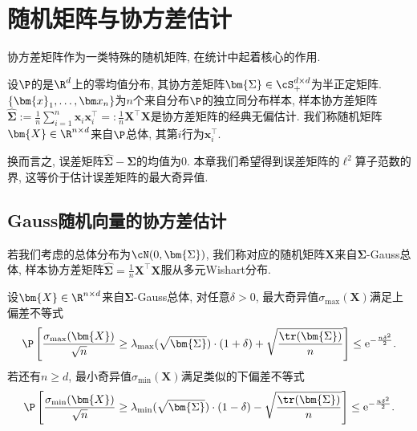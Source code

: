\section{随机矩阵与协方差估计}

协方差矩阵作为一类特殊的随机矩阵, 在统计中起着核心的作用. 

设$\P$的是$\R^d$上的零均值分布, 其协方差矩阵$\bm{\Sigma} \in \cS^{d \times d}_+$为半正定矩阵.
$\{\bm{x}_1, \dots, \bx_n\}$为$n$个来自分布$\P$的独立同分布样本, 样本协方差矩阵$\hat{\bm{\Sigma}} := \frac{1}{n} \sum_{i = 1}^n \bm{x}_i \bm{x}_i^\top =: \frac{1}{n} \bm{X}^\top \bm{X}$是协方差矩阵的经典无偏估计. 
我们称随机矩阵$\bm{X} \in \R^{n \times d}$来自$\P$总体, 其第$i$行为$\bm{x}_i^\top$.  

换而言之, 误差矩阵$\hat{\bm{\Sigma}} - \bm{\Sigma}$的均值为$0$. 
本章我们希望得到误差矩阵的$\ell^2$算子范数的界, 这等价于估计误差矩阵的最大奇异值. 

\subsection{Gauss随机向量的协方差估计}

若我们考虑的总体分布为$\cN(0, \bm{\Sigma})$, 我们称对应的随机矩阵$\bm{X}$来自$\bm{\Sigma}$-Gauss总体, 样本协方差矩阵$\hat{\bm{\Sigma}} = \frac{1}{n} \bm{X}^\top \bm{X}$服从多元Wishart分布. 

\begin{theorem}
	设$\bm{X} \in \R^{n \times d}$来自$\bm{\Sigma}$-Gauss总体, 对任意$\delta > 0$, 最大奇异值$\sigma_{\max}(\bm{X})$满足上偏差不等式
	\begin{equation*}
		\P \left[ \frac{\sigma_{\max}(\bm{X})}{\sqrt{n}} \geq \lambda_{\max} (\sqrt{\bm{\Sigma}}) \cdot (1+\delta) + \sqrt{\frac{\tr(\bm{\Sigma})}{n}} \right]
		\leq \mathrm{e}^{-\frac{n \delta^2}{2}}. 
	\end{equation*}
	若还有$n \geq d$, 最小奇异值$\sigma_{\min}(\bm{X})$满足类似的下偏差不等式
	\begin{equation*}
		\P \left[ \frac{\sigma_{\min}(\bm{X})}{\sqrt{n}} \geq \lambda_{\min} (\sqrt{\bm{\Sigma}}) \cdot (1-\delta) - \sqrt{\frac{\tr(\bm{\Sigma})}{n}} \right]
		\leq \mathrm{e}^{-\frac{n \delta^2}{2}}. 
	\end{equation*}
\end{theorem}

